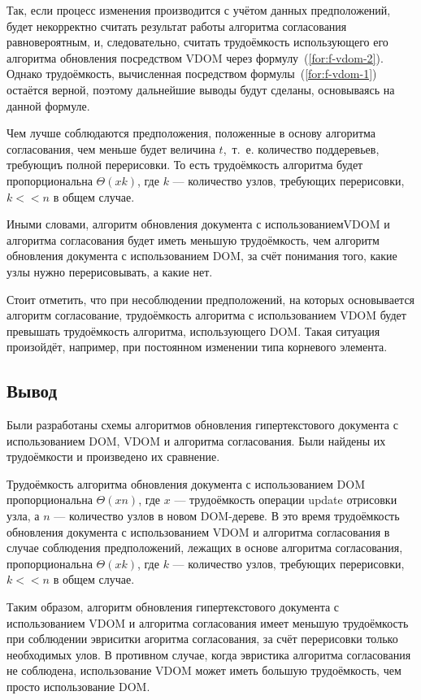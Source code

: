 Так, если процесс изменения производится с учётом данных предположений, будет некорректно считать результат работы алгоритма согласования равновероятным, и, следовательно, считать трудоёмкость использующего его алгоритма обновления посредством VDOM через формулу~(\ref{for:f-vdom-2}). 
Однако трудоёмкость, вычисленная посредством формулы~(\ref{for:f-vdom-1}) остаётся верной, поэтому дальнейшие выводы будут сделаны, основываясь на данной формуле.

Чем лучше соблюдаются предположения, положенные в основу алгоритма согласования, чем меньше будет величина $t$,~т.~е. количество поддеревьев, требующиъ полной перерисовки. 
То есть трудоёмкость алгоритма будет пропорциональна $\Theta(xk)$, где $k$ --- количество узлов, требующих перерисовки, $k << n$ в общем случае.

Иными словами, алгоритм обновления документа с использованием\break VDOM и алгоритма согласования будет иметь меньшую трудоёмкость, чем алгоритм обновления документа с использованием DOM, за счёт понимания того, какие узлы нужно перерисовывать, а какие нет.

Стоит отметить, что при несоблюдении предположений, на которых основывается алгоритм согласование, трудоёмкость алгоритма с использованием VDOM будет превышать трудоёмкость алгоритма, использующего DOM. 
Такая ситуация произойдёт, например, при постоянном изменении типа корневого элемента.

\subsection*{Вывод}

Были разработаны схемы алгоритмов обновления гипертекстового документа с использованием DOM, VDOM и алгоритма согласования. Были найдены их трудоёмкости и произведено их сравнение.

Трудоёмкость алгоритма обновления документа с использованием DOM пропорциональна $\Theta(xn)$, где $x$ --- трудоёмкость операции update отрисовки узла, а $n$ --- количество узлов в новом DOM-дереве.
В это время трудоёмкость обновления документа с использованием VDOM и алгоритма согласования в случае соблюдения предположений, лежащих в основе алгоритма согласования, пропорциональна $\Theta(xk)$, где $k$ --- количество узлов, требующих перерисовки, $k << n$ в общем случае.

Таким образом, алгоритм обновления гипертекстового документа с использованием VDOM и алгоритма согласования имеет меньшую трудоёмкость при соблюдении эвриситки агоритма согласования, за счёт перерисовки только необходимых улов.
В противном случае, когда эвристика алгоритма согласования не соблюдена, использование VDOM может иметь большую трудоёмкость, чем просто использование DOM.

\pagebreak